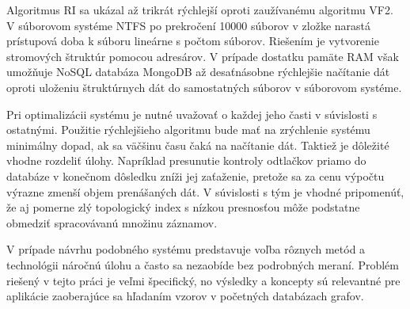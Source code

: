 \documentclass[slovak]{ExcelAtFIT} %
\begin{document}
Algoritmus RI sa ukázal až trikrát rýchlejší oproti zaužívanému algoritmu VF2. V súborovom systéme NTFS po prekročení 10000 súborov v zložke narastá prístupová doba k súboru lineárne s počtom súborov. Riešením je vytvorenie stromových štruktúr pomocou adresárov. V prípade dostatku pamäte RAM však umožňuje NoSQL databáza MongoDB až de\-sať\-ná\-sob\-ne rýchlejšie načítanie dát oproti uloženiu štruktúrnych dát do samostatných súborov v súborovom systéme. 

Pri optimalizácii systému je nutné uvažovať o kaž\-dej jeho časti v súvislosti s ostatnými. Použitie rý\-chlej\-šie\-ho algoritmu bude mať na zrýchlenie systému minimálny dopad, ak sa väčšinu času čaká na načítanie dát. Taktiež je dôležité vhodne rozdeliť úlohy. Na\-prí\-klad presunutie kontroly odtlačkov priamo do databáze v konečnom dôsledku zníži jej zaťaženie, pretože sa za cenu výpočtu výrazne zmenší objem prenášaných dát. V súvislosti s tým je vhodné pripomenúť, že aj pomerne zlý topologický index s nízkou presnosťou môže podstatne obmedziť spracovávanú množinu záznamov.

V prípade návrhu podobného systému predstavuje voľba rôznych metód a technológii náročnú úlohu a často sa nezaobíde bez podrobných meraní. Problém riešený v tejto práci je veľmi špecifický, no výsledky a koncepty sú relevantné pre aplikácie zaoberajúce sa hľadaním vzorov v početných databázach grafov. 
\end{document}
